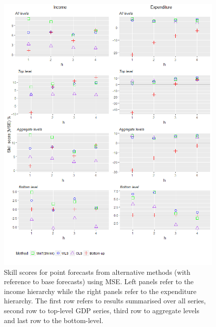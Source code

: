 \documentclass[graybox]{svmult}
\begin{document}
\begin{figure}
	\centering
	\small
	\includegraphics[width=\textwidth]{Figs/Results/PointF_MSE.png}
	\caption{Skill scores for point forecasts from alternative methods (with reference to base forecasts) using MSE. Left panels refer to the income hierarchy while the right panels refer to the expenditure hierarchy. The first row refers to results summarised over all series, second row to top-level GDP series, third row to aggregate levels and last row to the bottom-level.}
	\label{fig: PointF_MSE}
\end{figure}
\end{document}

